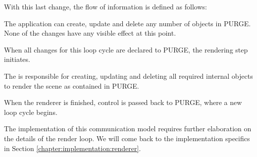 	With this last change, the flow of information is defined as follows:
	
	\begin{numlist}
		\item The application can create, update and delete any number of objects in PURGE. None of the changes have any visible effect at this point.
		\item When all changes for this loop cycle are declared to PURGE, the rendering step initiates.
		\item The  is responsible for creating, updating and deleting all required internal objects to render the scene as contained in PURGE.
		\item When the renderer is finished, control is passed back to PURGE, where a new loop cycle begins.
	\end{numlist}

	The implementation of this communication model requires further elaboration on the details of the render loop. We will come back to the implementation specifics in Section \ref{chapter:implementation:renderer}.

